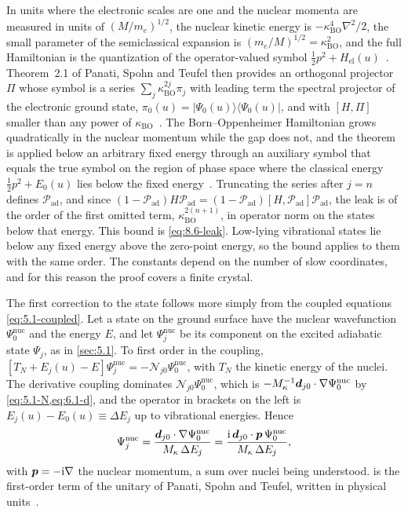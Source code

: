 In units where the electronic scales are one and the nuclear momenta are measured in units of $(M/m_e)^{1/2}$, the nuclear kinetic energy is $-\kappa_{\mathrm{BO}}^4\nabla^2/2$, the small parameter of the semiclassical expansion is $(m_e/M)^{1/2} = \kappa_{\mathrm{BO}}^2$, and the full Hamiltonian is the quantization of the operator-valued symbol $\tfrac12p^2 + H_{\mathrm{el}}(u)$~\cite[Eq.~(38)]{panati2003space}. Theorem~2.1 of Panati, Spohn and Teufel then provides an orthogonal projector $\Pi$ whose symbol is a series $\sum_j\kappa_{\mathrm{BO}}^{2j}\pi_j$ with leading term the spectral projector of the electronic ground state, $\pi_0(u) = |\Psi_0(u)\rangle\langle\Psi_0(u)|$, and with $[H, \Pi]$ smaller than any power of $\kappa_{\mathrm{BO}}$~\cite[Thm.~2.1]{panati2003space}. The Born--Oppenheimer Hamiltonian grows quadratically in the nuclear momentum while the gap does not, and the theorem is applied below an arbitrary fixed energy through an auxiliary symbol that equals the true symbol on the region of phase space where the classical energy $\frac12p^2 + E_0(u)$ lies below the fixed energy~\cite[Sect.~4.5]{panati2003space}. Truncating the series after $j = n$ defines $\mathcal{P}_{\mathrm{ad}}$, and since $(1 - \mathcal{P}_{\mathrm{ad}})H\mathcal{P}_{\mathrm{ad}} = (1 - \mathcal{P}_{\mathrm{ad}})[H, \mathcal{P}_{\mathrm{ad}}]\mathcal{P}_{\mathrm{ad}}$, the leak is of the order of the first omitted term, $\kappa_{\mathrm{BO}}^{2(n+1)}$, in operator norm on the states below that energy. This bound is \cref{eq:8.6-leak}. Low-lying vibrational states lie below any fixed energy above the zero-point energy, so the bound applies to them with the same order. The constants depend on the number of slow coordinates, and for this reason the proof covers a finite crystal.

The first correction to the state follows more simply from the coupled equations \cref{eq:5.1-coupled}. Let a state on the ground surface have the nuclear wavefunction $\Psi^{\mathrm{nuc}}_0$ and the energy $E$, and let $\Psi^{\mathrm{nuc}}_j$ be its component on the excited adiabatic state $\Psi_j$, as in \cref{sec:5.1}. To first order in the coupling, $[T_N + E_j(u) - E]\Psi^{\mathrm{nuc}}_j = -\mathcal{N}_{j0}\Psi^{\mathrm{nuc}}_0$, with $T_N$ the kinetic energy of the nuclei. The derivative coupling dominates $\mathcal{N}_{j0}\Psi^{\mathrm{nuc}}_0$, which is $-M_\kappa^{-1}\bm{d}_{j0}\cdot\nabla\Psi^{\mathrm{nuc}}_0$ by \cref{eq:5.1-N,eq:6.1-d}, and the operator in brackets on the left is $E_j(u) - E_0(u) \equiv \Delta E_j$ up to vibrational energies. Hence
\begin{equation}
  \Psi^{\mathrm{nuc}}_j = \frac{\bm{d}_{j0}\cdot\nabla\Psi^{\mathrm{nuc}}_0}{M_\kappa\,\Delta E_j} = \frac{\mathrm{i}\,\bm{d}_{j0}\cdot\bm{p}\,\Psi^{\mathrm{nuc}}_0}{M_\kappa\,\Delta E_j} ,
  \label{eq:D.28-tilt}
\end{equation}
with $\bm{p} = -\mathrm{i}\nabla$ the nuclear momentum, a sum over nuclei being understood.  is the first-order term of the unitary of Panati, Spohn and Teufel, written in physical units~\cite[below Eq.~(39)]{panati2003space}.

